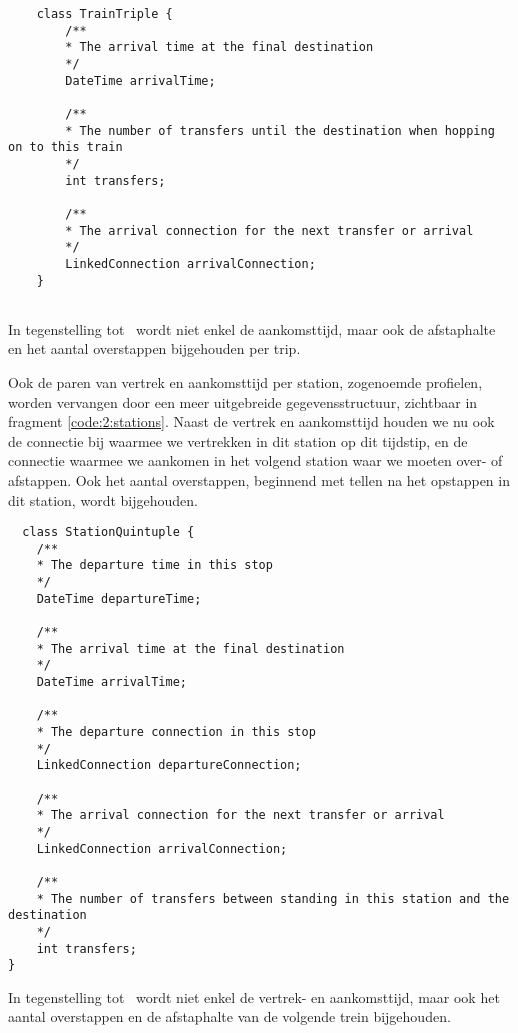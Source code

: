 \begin{code}
	\begin{verbatim}
	class TrainTriple {
		/**
		* The arrival time at the final destination
		*/
		DateTime arrivalTime;
		
		/**
		* The number of transfers until the destination when hopping on to this train
		*/
		int transfers;
		
		/**
		* The arrival connection for the next transfer or arrival
		*/
		LinkedConnection arrivalConnection;
	}
	
	\end{verbatim}
	\caption[CSA: Gegevensstructuur voor trips]{In tegenstelling tot~\cite{strasser17} wordt niet enkel de aankomsttijd, maar ook de afstaphalte en het aantal overstappen bijgehouden per trip.}
	\label{code:2:trips}
\end{code}

Ook de paren van vertrek en aankomsttijd per station, zogenoemde profielen, worden vervangen door een meer uitgebreide gegevensstructuur, zichtbaar in fragment \ref{code:2:stations}. Naast de vertrek en aankomsttijd houden we nu ook de connectie bij waarmee we vertrekken in dit station op dit tijdstip, en de connectie waarmee we aankomen in het volgend station waar we moeten over- of afstappen. Ook het aantal overstappen, beginnend met tellen na het opstappen in dit station, wordt bijgehouden.

\begin{code}
\begin{verbatim}
  class StationQuintuple {
	/**
	* The departure time in this stop
	*/
	DateTime departureTime;
	
	/**
	* The arrival time at the final destination
	*/
	DateTime arrivalTime;
	
	/**
	* The departure connection in this stop
	*/
	LinkedConnection departureConnection;
	
	/**
	* The arrival connection for the next transfer or arrival
	*/
	LinkedConnection arrivalConnection;
	
	/**
	* The number of transfers between standing in this station and the destination
	*/
	int transfers;
}
	\end{verbatim}
		\caption[CSA: Gegevensstructuur voor stopprofielen]{In tegenstelling tot~\cite{strasser17} wordt niet enkel de vertrek- en aankomsttijd, maar ook het aantal overstappen en de afstaphalte van de volgende trein bijgehouden.}
	\label{code:2:stations}
\end{code}

